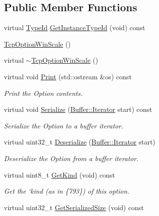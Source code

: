 \subsection*{Public Member Functions}
\begin{DoxyCompactItemize}
\item 
virtual \hyperlink{classns3_1_1TypeId}{Type\+Id} \hyperlink{classns3_1_1TcpOptionWinScale_ac23e79ccc3131c763f984f5f9f4b34b6}{Get\+Instance\+Type\+Id} (void) const 
\item 
\hyperlink{classns3_1_1TcpOptionWinScale_a2224e70c700b5fca383d001e3f05c7fc}{Tcp\+Option\+Win\+Scale} ()
\item 
virtual \hyperlink{classns3_1_1TcpOptionWinScale_a8f095c70e71fab99110bb9f6347eee2a}{$\sim$\+Tcp\+Option\+Win\+Scale} ()
\item 
virtual void \hyperlink{classns3_1_1TcpOptionWinScale_a85b33007ebb743e4f2dfa4c5b9d6e347}{Print} (std\+::ostream \&os) const 
\begin{DoxyCompactList}\small\item\em Print the Option contents. \end{DoxyCompactList}\item 
virtual void \hyperlink{classns3_1_1TcpOptionWinScale_ac0cc4f3dfef1d0d7e03725fc83acd3b0}{Serialize} (\hyperlink{classns3_1_1Buffer_1_1Iterator}{Buffer\+::\+Iterator} start) const 
\begin{DoxyCompactList}\small\item\em Serialize the Option to a buffer iterator. \end{DoxyCompactList}\item 
virtual uint32\+\_\+t \hyperlink{classns3_1_1TcpOptionWinScale_a9148d24a4497a28e1b99d2946ca56421}{Deserialize} (\hyperlink{classns3_1_1Buffer_1_1Iterator}{Buffer\+::\+Iterator} start)
\begin{DoxyCompactList}\small\item\em Deserialize the Option from a buffer iterator. \end{DoxyCompactList}\item 
virtual uint8\+\_\+t \hyperlink{classns3_1_1TcpOptionWinScale_a371648fffabfc6ec6fd365bdc9ef1629}{Get\+Kind} (void) const 
\begin{DoxyCompactList}\small\item\em Get the `kind\textquotesingle{} (as in \{793\}) of this option. \end{DoxyCompactList}\item 
virtual uint32\+\_\+t \hyperlink{classns3_1_1TcpOptionWinScale_a4d4282ca4e8c29926b7ab2802bb6a13a}{Get\+Serialized\+Size} (void) const 

\end{DoxyCompactItemize}
